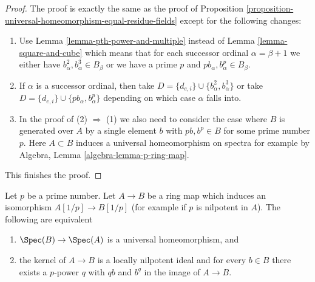 \begin{proof}
The proof is exactly the same as the proof of
Proposition \ref{proposition-universal-homeomorphism-equal-residue-fields}
except for the following changes:
\begin{enumerate}
\item Use Lemma \ref{lemma-pth-power-and-multiple} instead of
Lemma \ref{lemma-square-and-cube} which means that for each successor
ordinal $\alpha = \beta + 1$ we either have
$b_\alpha^2, b_\alpha^3 \in B_\beta$ or we have a prime $p$ and
$pb_\alpha, b_\alpha^p \in B_\beta$.
\item If $\alpha$ is a successor ordinal, then take
$D = \{d_{e, i}\} \cup \{b_\alpha^2, b_\alpha^3\}$ or
take $D = \{d_{e, i}\} \cup \{pb_\alpha, b_\alpha^p\}$ depending
on which case $\alpha$ falls into.
\item In the proof of (2) $\Rightarrow$ (1) we also need to consider
the case where $B$ is generated over $A$ by a single element $b$
with $pb, b^p \in B$ for some prime number $p$. Here $A \subset B$
induces a universal homeomorphism on spectra for example by
Algebra, Lemma \ref{algebra-lemma-p-ring-map}.
\end{enumerate}
This finishes the proof.
\end{proof}

\begin{lemma}
\label{lemma-universal-homeo-iso-if-invert-p}
Let $p$ be a prime number. Let $A \to B$ be a ring map
which induces an isomorphism $A[1/p] \to B[1/p]$
(for example if $p$ is nilpotent in $A$).
The following are equivalent
\begin{enumerate}
\item $\Spec(B) \to \Spec(A)$ is a universal homeomorphism, and
\item the kernel of $A \to B$ is a locally nilpotent ideal and
for every $b \in B$ there exists a $p$-power $q$ with $qb$ and $b^q$
in the image of $A \to B$.
\end{enumerate}
\end{lemma}

